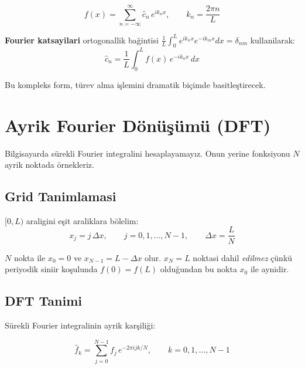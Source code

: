 \begin{equation}
\boxed{f(x) = \sum_{n=-\infty}^{\infty} \hat{c}_n \, e^{i k_n x}, \qquad k_n = \frac{2\pi n}{L}}
\label{eq:fourier_complex}
\end{equation}

\textbf{Fourier katsayilari} ortogonallik bağintisi $\frac{1}{L}\int_0^L e^{ik_n x}e^{-ik_m x}dx = \delta_{nm}$ kullanilarak:
\begin{equation}
\boxed{\hat{c}_n = \frac{1}{L}\int_0^{L} f(x)\,e^{-ik_n x}\,dx}
\label{eq:fourier_coeff}
\end{equation}

Bu kompleks form, türev alma işlemini dramatik biçimde basitleştirecek.


\section{Ayrik Fourier Dönüşümü (DFT)}
\label{sec:dft}

Bilgisayarda sürekli Fourier integralini hesaplayamayız. Onun yerine fonksiyonu $N$ ayrik noktada örnekleriz.

\subsection{Grid Tanimlamasi}

$[0, L)$ araligini eşit araliklara bölelim:
\begin{equation}
x_j = j\,\Delta x, \qquad j = 0, 1, \ldots, N-1, \qquad \Delta x = \frac{L}{N}
\label{eq:grid}
\end{equation}

\begin{remark}
$N$ nokta ile $x_0 = 0$ ve $x_{N-1} = L - \Delta x$ olur. $x_N = L$ noktasi dahil \emph{edilmez} çünkü periyodik siniir koşulunda $f(0) = f(L)$ olduğundan bu nokta $x_0$ ile aynidir.
\end{remark}

\subsection{DFT Tanimi}

Sürekli Fourier integralinin ayrik karşiliği:

\begin{equation}
\boxed{\hat{f}_k = \sum_{j=0}^{N-1} f_j \, e^{-2\pi i j k / N}, \qquad k = 0, 1, \ldots, N-1}
\label{eq:dft}
\end{equation}

